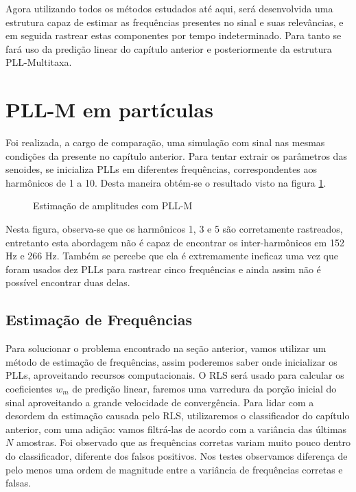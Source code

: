 

Agora utilizando todos os métodos estudados até aqui, será desenvolvida uma estrutura capaz de estimar as frequências presentes no sinal e suas relevâncias, e em seguida rastrear estas componentes por tempo indeterminado. Para tanto se fará uso da predição linear do capítulo anterior e posteriormente da estrutura PLL-Multitaxa. 

\section{PLL-M em partículas}

Foi realizada, a cargo de comparação, uma simulação com sinal nas mesmas condições da presente no capítulo anterior. Para tentar extrair os parâmetros das senoides, se inicializa PLLs em diferentes frequências, correspondentes aos harmônicos de 1 a 10. Desta maneira obtém-se o resultado visto na figura \ref{fig:pll_comp}.

\begin{figure}[H]
	\centering    
	\def\svgwidth{\columnwidth}
	
	\caption{Estimação de amplitudes com PLL-M}
	\label{fig:pll_comp}
\end{figure}

Nesta figura, observa-se que os harmônicos 1, 3 e 5 são corretamente rastreados, entretanto esta abordagem não é capaz de encontrar os inter-harmônicos em 152 Hz e 266 Hz. Também se percebe que ela é extremamente ineficaz uma vez que foram usados dez PLLs para rastrear cinco frequências e ainda assim não é possível encontrar duas delas.

\subsection{Estimação de Frequências}

Para solucionar o problema encontrado na seção anterior, vamos utilizar um método de estimação de frequências, assim poderemos saber onde inicializar os PLLs, aproveitando recursos computacionais. O RLS será usado para calcular os coeficientes $w_m$ de predição linear, faremos uma varredura da porção inicial do sinal aproveitando a grande velocidade de convergência. Para lidar com a desordem da estimação causada pelo RLS, utilizaremos o classificador do capítulo anterior, com uma adição: vamos filtrá-las de acordo com a variância das últimas $N$ amostras. Foi observado que as frequências corretas variam muito pouco dentro do classificador, diferente dos falsos positivos. Nos testes observamos diferença de pelo menos uma ordem de magnitude entre a variância de frequências corretas e falsas.

